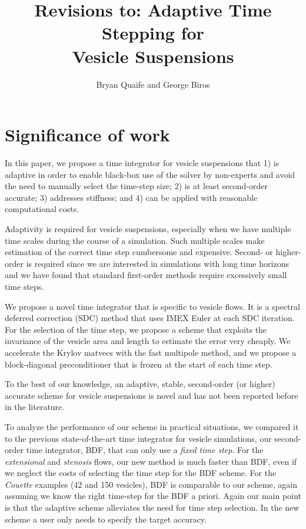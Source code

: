 \documentclass[12pt]{article}
\title{Revisions to: Adaptive Time Stepping for \\ Vesicle Suspensions}
\author{Bryan Quaife and George Biros}
\begin{document}
\maketitle


\section*{Significance of work}
In this paper, we propose a time integrator for vesicle suspensions
that 1) is adaptive in order to enable black-box use of the solver by
non-experts and avoid the need to manually select the time-step size;
2) is at least second-order accurate; 3) addresses stiffness; and 4)
can be applied with reasonable computational costs.

Adaptivity is required for vesicle suspensions, especially when we have
multiple time scales during the course of a simulation. Such multiple
scales make estimation of the correct time step cumbersome and
expensive.  Second- or higher-order is required since we are interested
in simulations with long time horizons and we have found that standard
first-order methods require excessively small time steps.

We propose a novel time integrator that is specific to vesicle flows.
It is a spectral deferred correction (SDC) method that uses IMEX Euler
at each SDC iteration.  For the selection of the time step, we propose
a scheme that exploits the invariance of the vesicle area and length to
estimate the error very cheaply. We accelerate the Krylov matvecs with
the fast multipole method, and we propose a block-diagonal
preconditioner that is frozen at the start of each time step. 

To the best of our knowledge, an adaptive, stable, second-order (or
higher) accurate scheme for vesicle suspensions is novel and has not
been reported before in the literature.

To analyze the performance of our scheme in practical situations, we
compared it to the previous state-of-the-art time integrator for
vesicle simulations, our second-order time integrator, BDF, that can
only use a {\em fixed time step}.  For the {\em extensional} and {\em
stenosis} flows, our new method is much faster than BDF, even if we
neglect the costs of selecting the time step for the BDF scheme.  For
the {\em Couette} examples (42 and 150 vesicles), BDF is comparable to
our scheme, again assuming we know the right time-step for the BDF a
priori. Again our main point is that the adaptive scheme alleviates the
need for time step selection. In the new scheme a user only needs to
specify the target accuracy.
\end{document}

